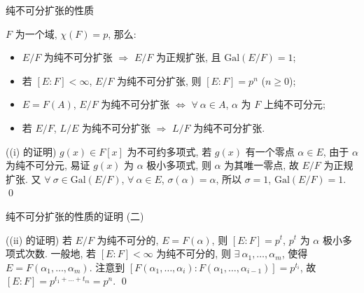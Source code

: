 \begin{frame}{纯不可分扩张的性质}

\begin{lem}[纯不可分扩张的性质]
$F$ 为一个域, $\chi(F) = p$, 那么:
\begin{itemize}
\item[(i)] $E/F$ 为纯不可分扩张 $\Longrightarrow$ $E/F$ 为正规扩张,
  且 $\mathrm{Gal}(E/F) = 1$;
\item[(ii)] 若 $[E:F] < \infty$, $E/F$ 为纯不可分扩张,
  则 $[E:F] = p^n$ ($n \geq 0$);
\item[(iii)] $E = F(A)$, $E/F$ 为纯不可分扩张 $\iff$
  $\forall\ \alpha \in A$, $\alpha$ 为 $F$ 上纯不可分元;
\item[(iv)] 若 $E/F$, $L/E$ 为纯不可分扩张 $\Longrightarrow$ $L/F$ 为纯不可分扩张.
\end{itemize}
\end{lem}

\startproof[bg=yellow, fg=red]((i) 的证明)
$g(x) \in F[x]$ 为不可约多项式, 若 $g(x)$ 有一个零点 $\alpha \in E$,
由于 $\alpha$ 为纯不可分元, 易证 $g(x)$ 为 $\alpha$ 极小多项式,
则 $\alpha$ 为其唯一零点, 故 $E/F$ 为正规扩张.
又 $\forall\ \sigma \in \mathrm{Gal}(E/F)$, $\forall\ \alpha \in E$, $\sigma(\alpha) = \alpha$,
所以 $\sigma = 1$, $\mathrm{Gal}(E/F) = 1$.
\qed

\end{frame}


\begin{frame}{纯不可分扩张的性质的证明 (二)}

\startproof[bg=yellow, fg=red]((ii) 的证明)
若 $E/F$ 为纯不可分的, $E = F(\alpha)$, 则 $[E:F] = p^t$,
$p^t$ 为 $\alpha$ 极小多项式次数.
一般地, 若 $[E:F] < \infty$ 为纯不可分的, 则 $\exists\ \alpha_1, \dots, \alpha_m$,
使得 $E = F(\alpha_1, \dots, \alpha_m)$.
注意到 $[F(\alpha_1, \dots, \alpha_i):F(\alpha_1, \dots, \alpha_{i-1})] = p^{t_i}$,
故 $[E:F] = p^{t_1 + \dots + t_m} = p^n$.
\qed

\end{frame}


